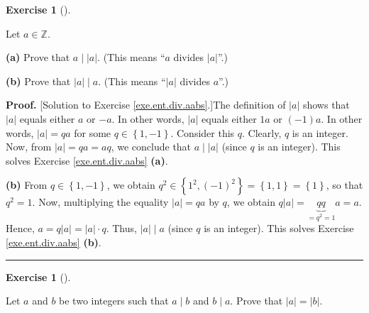 \documentclass[numbers=enddot,12pt,final,onecolumn,notitlepage]{scrartcl}%
\newcounter{exer}
\numberwithin{exer}{subsection}
\theoremstyle{definition}
\newtheorem{exmp}[exer]{Exercise}
\newenvironment{exercise}[1][]
{\begin{exmp}[#1]\begin{leftbar}}
{\end{leftbar}\end{exmp}}
\newenvironment{fineprint}{\begin{small}}{\end{small}}
\newenvironment{proof}[1][Proof]{\noindent\textbf{#1.} }{\ \rule{0.5em}{0.5em}}
\begin{document}
\begin{exercise}
\label{exe.ent.div.aabs}Let $a\in\mathbb{Z}$.

\textbf{(a)} Prove that $a\mid\left\vert a\right\vert $. (This means
\textquotedblleft$a$ divides $\left\vert a\right\vert $\textquotedblright.)

\textbf{(b)} Prove that $\left\vert a\right\vert \mid a$. (This means
\textquotedblleft$\left\vert a\right\vert $ divides $a$\textquotedblright.)
\end{exercise}

\begin{fineprint}
\begin{proof}
[Solution to Exercise \ref{exe.ent.div.aabs}.]The definition of $\left\vert
a\right\vert $ shows that $\left\vert a\right\vert $ equals either $a$ or
$-a$. In other words, $\left\vert a\right\vert $ equals either $1a$ or
$\left(  -1\right)  a$. In other words, $\left\vert a\right\vert =qa$ for some
$q\in\left\{  1,-1\right\}  $. Consider this $q$. Clearly, $q$ is an integer.
Now, from $\left\vert a\right\vert =qa=aq$, we conclude that $a\mid\left\vert
a\right\vert $ (since $q$ is an integer). This solves Exercise
\ref{exe.ent.div.aabs} \textbf{(a)}.

\textbf{(b)} From $q\in\left\{  1,-1\right\}  $, we obtain $q^{2}\in\left\{
1^{2},\left(  -1\right)  ^{2}\right\}  =\left\{  1,1\right\}  =\left\{
1\right\}  $, so that $q^{2}=1$. Now, multiplying the equality $\left\vert
a\right\vert =qa$ by $q$, we obtain $q\left\vert a\right\vert =\underbrace{qq}%
_{=q^{2}=1}a=a$. Hence, $a=q\left\vert a\right\vert =\left\vert a\right\vert
\cdot q$. Thus, $\left\vert a\right\vert \mid a$ (since $q$ is an integer).
This solves Exercise \ref{exe.ent.div.aabs} \textbf{(b)}.
\end{proof}
\end{fineprint}

\begin{exercise}
\label{exe.ent.div.abba}Let $a$ and $b$ be two integers such that $a\mid b$
and $b\mid a$. Prove that $\left\vert a\right\vert =\left\vert b\right\vert $.
\end{exercise}
\end{document}
